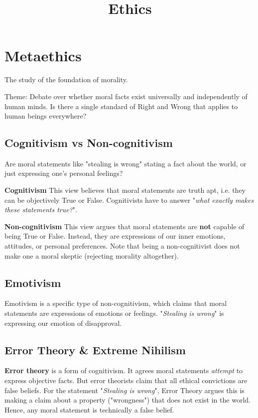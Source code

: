 \documentclass[12pt]{article}
\title{Ethics}
\date{}
\author{}
\begin{document}
\maketitle
\tableofcontents
\newpage

\section{Metaethics}
The study of the foundation of morality.

\noindent Theme: Debate over whether moral facts exist universally and independently of human minds.
Is there a single standard of Right and Wrong that applies to human beings everywhere?

\subsection{Cognitivism vs Non-cognitivism}
Are moral statements like "stealing is wrong" stating a fact about the world,
or just expressing one's personal feelings?

\textbf{Cognitivism} This view believes that moral statements are truth apt,
i.e. they can be objectively True or False. Cognitivists have to answer "\textit{what exactly makes these statements true?}".

\textbf{Non-cognitivism} This view argues that moral statements are \textbf{not} capable of 
being True or False. Instead, they are expressions of our inner emotions, attitudes, or personal preferences.
Note that being a non-cognitivist does not make one a moral skeptic (rejecting morality altogether).

\subsection{Emotivism}
Emotivism is a specific type of non-cognitivism, which claims that moral statements are expressions of emotions or feelings.
"\textit{Stealing is wrong}" is expressing our emotion of disapproval.

\subsection{Error Theory \& Extreme Nihilism}

\textbf{Error theory} is a form of cognitivism. It agrees moral statements \textit{attempt} to express objective facts.
But error theorists claim that all ethical convictions are false beliefs.
For the statement "\textit{Stealing is wrong}", Error Theory argues this is making a claim about a property ("wrongness")
that does not exist in the world. Hence, any moral statement is technically a false belief.
\end{document}
